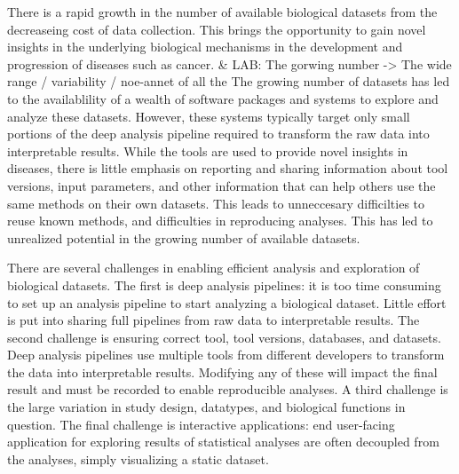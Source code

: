 

There is a rapid growth in the number of available biological datasets from the
decreaseing cost of data collection. 
This brings the opportunity to gain novel
insights in the underlying biological mechanisms in the development and
progression of diseases such as cancer. 
& LAB: The gorwing number -> The wide range / variability / noe-annet of all the 
The growing number of datasets has led
to the availablility of a wealth of software packages and systems to explore and
analyze these datasets. 
However, these systems typically target only small
portions of the deep analysis pipeline required to transform the raw data into
interpretable results. While the tools are used to provide novel insights in
diseases, there is little emphasis on reporting and sharing information about
tool versions, input parameters, and other information that can help others use
the same methods on their own datasets. This leads to unneccesary difficilties
to reuse known methods, and difficulties in reproducing analyses. 
This has led
to unrealized potential in the growing number of available datasets. 

There are several challenges in enabling 
efficient analysis and exploration of
biological datasets. 
The first is deep analysis pipelines: it is too time consuming to set up 
an
analysis pipeline to start analyzing a biological dataset. 
Little effort is put
into sharing full pipelines from raw data to interpretable results.
The second challenge is ensuring correct tool, tool versions, databases, and
datasets. Deep analysis pipelines use multiple tools from different developers
to transform the data into interpretable results. Modifying any of these will
impact the final result and must be recorded to enable reproducible analyses. 
A third challenge is the large variation in study design, datatypes,
and biological functions in question.
The final challenge is interactive applications: end user-facing application
for exploring results of statistical analyses are often decoupled from the
analyses, simply visualizing a static dataset.  

